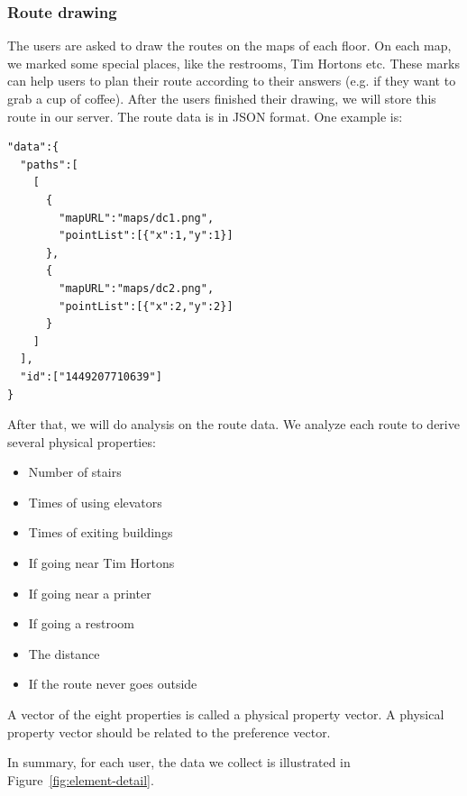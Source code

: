 \documentclass{sigchi}
\begin{document}
\subsubsection{Route drawing}

The users are asked to draw the routes on the maps of each floor. On each map, we marked some special places, like the restrooms, Tim Hortons etc. These marks can help users to plan their route according to their answers (e.g. if they want to grab a cup of coffee). After the users finished their drawing, we will store this route in our server. The route data is in JSON format. One example is:

\begin{verbatim}
"data":{
  "paths":[
    [
      {
        "mapURL":"maps/dc1.png",
        "pointList":[{"x":1,"y":1}]
      },
      {
        "mapURL":"maps/dc2.png",
        "pointList":[{"x":2,"y":2}]
      }
    ]
  ],
  "id":["1449207710639"]
}
\end{verbatim}

After that, we will do analysis on the route data. We analyze each route to derive several physical properties:
\begin{itemize}
\item Number of stairs
\item Times of using elevators
\item Times of exiting buildings
\item If going near Tim Hortons
\item If going near a printer
\item If going a restroom
\item The distance
\item If the route never goes outside
\end{itemize}

A vector of the eight properties is called a physical property vector. A physical property vector should be related to the preference vector.


In summary, for each user, the data we collect is illustrated in Figure~\ref{fig:element-detail}.
\end{document}
